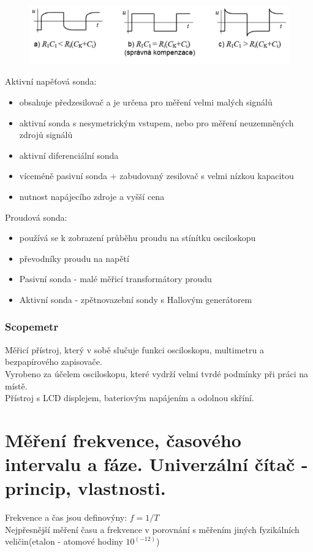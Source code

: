 \begin{figure}[H]
    \includegraphics*[scale = 1]{images/osciloskopSonda.png}
\end{figure}

Aktivní napěťová sonda:
\begin{itemize}
    \item obsahuje předzesilovač a je určena pro měření velmi malých signálů
    \item aktivní sonda s nesymetrickým vstupem, nebo pro měření neuzemněných zdrojů signálů 
    \item aktivní diferenciální sonda
    \item víceméně pasivní sonda + zabudovaný zesilovač s velmi nízkou kapacitou
    \item nutnost napájecího zdroje a vyšší cena
\end{itemize}

Proudová sonda:
\begin{itemize}
    \item používá se k zobrazení průběhu proudu na stínítku osciloskopu 
    \item převodníky proudu na napětí 
    \item Pasivní sonda - malé měřicí transformátory proudu 
    \item Aktivní sonda - zpětnovazební sondy s Hallovým generátorem
\end{itemize}

\subsubsection*{Scopemetr}
Měřicí přístroj, který v sobě slučuje funkci osciloskopu, multimetru a bezpapírového zapisovače.\\
Vyrobeno za účelem osciloskopu, které vydrží velmi tvrdé podmínky při práci na místě.\\
Přístroj s LCD displejem, bateriovým napájením a odolnou skříní.\\


\section{Měření frekvence, časového intervalu a fáze. Univerzální čítač - princip, vlastnosti.}
Frekvence a čas jsou definovýny: $f = 1/T$\\
Nejpřesnější měření času a frekvence v porovnání s měřením jiných fyzikálních veličin(etalon - atomové hodiny $10^(-12)$)\\

